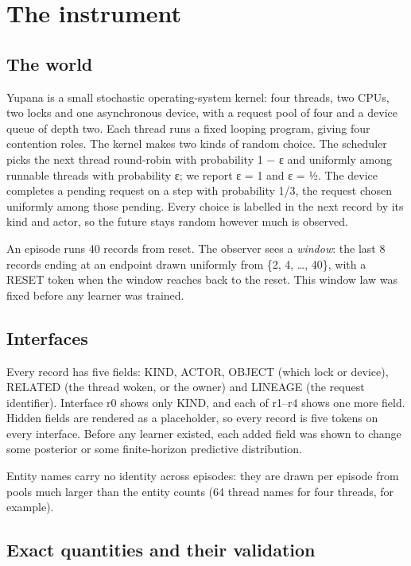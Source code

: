 \documentclass[10pt]{article}
\begin{document}
\hypertarget{the-instrument}{%
\section{The instrument}\label{the-instrument}}

\hypertarget{the-world}{%
\subsection{The world}\label{the-world}}

Yupana is a small stochastic operating-system kernel: four threads, two CPUs, two locks and one asynchronous device,
with a request pool of four and a device queue of depth two. Each thread runs a fixed looping program, giving four
contention roles. The kernel makes two kinds of random choice. The scheduler picks the next thread round-robin with
probability 1 − ε and uniformly among runnable threads with probability ε; we report ε = 1 and ε = ½. The device
completes a pending request on a step with probability 1/3, the request chosen uniformly among those pending. Every
choice is labelled in the next record by its kind and actor, so the future stays random however much is observed.

An episode runs 40 records from reset. The observer sees a \emph{window}: the last 8 records ending at an endpoint drawn
uniformly from \{2, 4, \ldots, 40\}, with a RESET token when the window reaches back to the reset. This window law was fixed
before any learner was trained.

\hypertarget{interfaces}{%
\subsection{Interfaces}\label{interfaces}}

Every record has five fields: KIND, ACTOR, OBJECT (which lock or device), RELATED (the thread woken, or the owner) and
LINEAGE (the request identifier). Interface r0 shows only KIND, and each of r1--r4 shows one more field. Hidden fields
are rendered as a placeholder, so every record is five tokens on every interface. Before any learner existed, each added
field was shown to change some posterior or some finite-horizon predictive distribution.

Entity names carry no identity across episodes: they are drawn per episode from pools much larger than the entity
counts (64 thread names for four threads, for example).

\hypertarget{exact-quantities-and-their-validation}{%
\subsection{Exact quantities and their validation}\label{exact-quantities-and-their-validation}}
\end{document}

